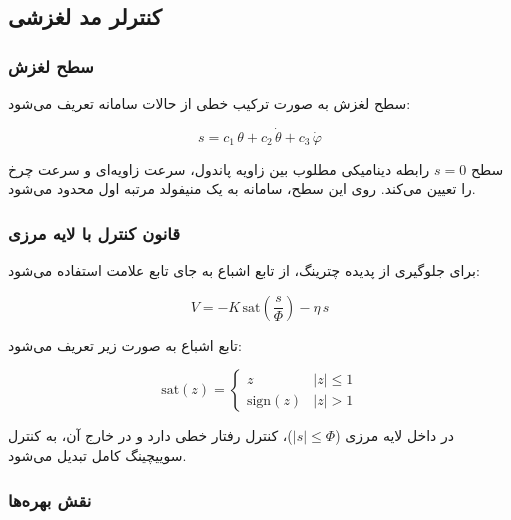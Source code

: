 \subsection{کنترلر مد لغزشی}

\subsubsection{سطح لغزش}

سطح لغزش به صورت ترکیب خطی از حالات سامانه تعریف می‌شود:

\begin{equation}
s = c_1\,\theta + c_2\,\dot\theta + c_3\,\dot\varphi
\label{eq:sliding-surface}
\end{equation}

سطح $s = 0$ رابطه دینامیکی مطلوب بین زاویه پاندول، سرعت زاویه‌ای و سرعت چرخ را تعیین می‌کند. روی این سطح، سامانه به یک منیفولد مرتبه اول محدود می‌شود.

\subsubsection{قانون کنترل با لایه مرزی}

برای جلوگیری از پدیده چترینگ، از تابع اشباع به جای تابع علامت استفاده می‌شود:

\begin{equation}
V = -K\,\text{sat}\!\left(\frac{s}{\Phi}\right) - \eta\,s
\label{eq:smc-law}
\end{equation}

تابع اشباع به صورت زیر تعریف می‌شود:

\begin{equation}
\text{sat}(z) = \begin{cases} z & |z| \leq 1 \\ \text{sign}(z) & |z| > 1 \end{cases}
\end{equation}

در داخل لایه مرزی ($|s| \leq \Phi$)، کنترل رفتار خطی دارد و در خارج آن، به کنترل سوییچینگ کامل تبدیل می‌شود.

\subsubsection{نقش بهره‌ها}

